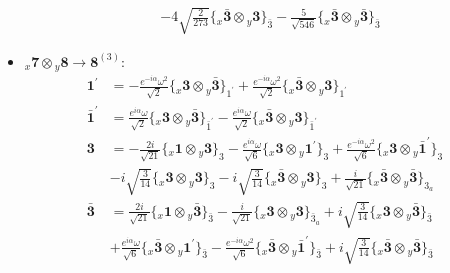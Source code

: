 \documentclass[english]{article}
\newcommand{\rep}[1]{\mathbf{#1}}
\newcommand{\repx}[2]{{}_{#2}\mathbf{#1}}
\newcommand{\tsprodx}[2]{\repx{#1}{x}\otimes\repx{#2}{y}}
\newcommand{\subcgt}[3]{\big\{ \tsprodx{#1}{#2}\big\}^{}_{#3}}
\begin{document}
\begin{itemize}
\begin{align*}
 & -4 \sqrt{\frac{2}{273}}\subcgt{\bar{3}}{3}{\bar{3}}-\frac{5}{\sqrt{546}}\subcgt{\bar{3}}{\bar{3}}{\bar{3}}
\end{align*}
\item $\tsprodx{7}{8}\to\rep{8}^{(3)}$:
\begin{align*}
\rep{1^{\prime}} & = -\frac{e^{-i \alpha } \omega ^2}{\sqrt{2}}\subcgt{3}{\bar{3}}{1^{\prime}}+\frac{e^{-i \alpha } \omega ^2}{\sqrt{2}}\subcgt{\bar{3}}{3}{1^{\prime}}
\\
\rep{\bar{1}^{\prime}} & = \frac{e^{i \alpha } \omega }{\sqrt{2}}\subcgt{3}{\bar{3}}{\bar{1}^{\prime}}-\frac{e^{i \alpha } \omega }{\sqrt{2}}\subcgt{\bar{3}}{3}{\bar{1}^{\prime}}
\\
\rep{3} & = -\frac{2 i}{\sqrt{21}}\subcgt{1}{3}{3}-\frac{e^{i \alpha } \omega }{\sqrt{6}}\subcgt{3}{1^{\prime}}{3}+\frac{e^{-i \alpha } \omega ^2}{\sqrt{6}}\subcgt{3}{\bar{1}^{\prime}}{3} \\ 
 & -i \sqrt{\frac{3}{14}}\subcgt{3}{3}{3}-i \sqrt{\frac{3}{14}}\subcgt{\bar{3}}{3}{3}+\frac{i}{\sqrt{21}}\subcgt{\bar{3}}{\bar{3}}{3_{a}}
\\
\rep{\bar{3}} & = \frac{2 i}{\sqrt{21}}\subcgt{1}{\bar{3}}{\bar{3}}-\frac{i}{\sqrt{21}}\subcgt{3}{3}{\bar{3}_{a}}+i \sqrt{\frac{3}{14}}\subcgt{3}{\bar{3}}{\bar{3}} \\ 
 & +\frac{e^{i \alpha } \omega }{\sqrt{6}}\subcgt{\bar{3}}{1^{\prime}}{\bar{3}}-\frac{e^{-i \alpha } \omega ^2}{\sqrt{6}}\subcgt{\bar{3}}{\bar{1}^{\prime}}{\bar{3}}+i \sqrt{\frac{3}{14}}\subcgt{\bar{3}}{\bar{3}}{\bar{3}}
\end{align*}
\end{itemize}
\end{document}
